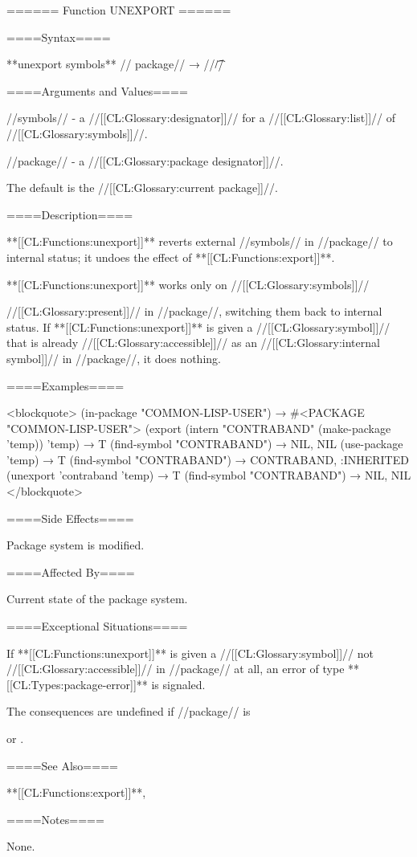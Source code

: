 ====== Function UNEXPORT ======

====Syntax====

**unexport {symbols** //\opt} package// → //\t//

====Arguments and Values====

//symbols// - a //[[CL:Glossary:designator]]// for a //[[CL:Glossary:list]]// of //[[CL:Glossary:symbols]]//.

//package// - a //[[CL:Glossary:package designator]]//.

The default is the //[[CL:Glossary:current package]]//.

====Description====

**[[CL:Functions:unexport]]** reverts external //symbols// in //package// to internal status; it undoes the effect of **[[CL:Functions:export]]**.

**[[CL:Functions:unexport]]** works only on //[[CL:Glossary:symbols]]//

//[[CL:Glossary:present]]// in //package//, switching them back to internal status. If **[[CL:Functions:unexport]]** is given a //[[CL:Glossary:symbol]]// that is already //[[CL:Glossary:accessible]]// as an //[[CL:Glossary:internal symbol]]// in //package//, it does nothing.

====Examples====

<blockquote> (in-package "COMMON-LISP-USER") → #<PACKAGE "COMMON-LISP-USER"> (export (intern "CONTRABAND" (make-package 'temp)) 'temp) → T (find-symbol "CONTRABAND") → NIL, NIL (use-package 'temp) → T (find-symbol "CONTRABAND") → CONTRABAND, :INHERITED (unexport 'contraband 'temp) → T (find-symbol "CONTRABAND") → NIL, NIL </blockquote>

====Side Effects====

Package system is modified.

====Affected By====

Current state of the package system.

====Exceptional Situations====

If **[[CL:Functions:unexport]]** is given a //[[CL:Glossary:symbol]]// not //[[CL:Glossary:accessible]]// in //package// at all, an error of type **[[CL:Types:package-error]]** is signaled.

The consequences are undefined if //package// is 

or .

====See Also====

**[[CL:Functions:export]]**, {\secref\PackageConcepts}

====Notes====

None.

